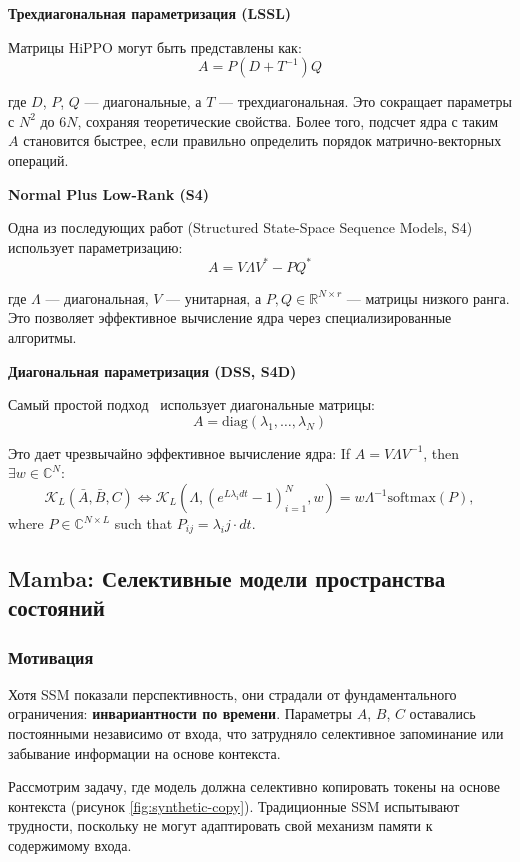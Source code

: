 \documentclass[11pt]{extarticle}
\begin{document}
\textbf{Трехдиагональная параметризация (LSSL)}

Матрицы HiPPO могут быть представлены как:
$$A = P(D + T^{-1})Q$$

где $D$, $P$, $Q$ — диагональные, а $T$ — трехдиагональная. Это сокращает параметры с $N^2$ до $6N$, сохраняя теоретические свойства. Более того, подсчет ядра с таким $A$ становится быстрее, если правильно определить порядок матрично-векторных операций.

\textbf{Normal Plus Low-Rank (S4)}

Одна из последующих работ (Structured State-Space Sequence Models, S4)~\cite{gu2022efficientlymodelinglongsequences} использует параметризацию:
$$A = V\Lambda V^* - PQ^*$$

где $\Lambda$ — диагональная, $V$ — унитарная, а $P, Q \in \mathbb{R}^{N \times r}$ — матрицы низкого ранга. Это позволяет эффективное вычисление ядра через специализированные алгоритмы.

\textbf{Диагональная параметризация (DSS, S4D)}

Самый простой подход~\cite{gupta2022diagonalstatespaceseffective,gu2022parameterizationinitializationdiagonalstate} использует диагональные матрицы:
$$A = \text{diag}(\lambda_1, \ldots, \lambda_N)$$

Это дает чрезвычайно эффективное вычисление ядра:
If $A=V\Lambda V^{-1}$, then $\exists w\in\mathbb{C}^N$:
$$
\mathcal{K}_L(\bar A, \bar B, C)\Leftrightarrow \mathcal{K}_L(\Lambda, (e^{L\lambda_i dt}-1)_{i=1}^N, w)=w\Lambda^{-1}\text{softmax}(P),
$$
where $P\in\mathbb{C}^{N\times L}$ such that $P_{ij}=\lambda_ij\cdot dt$.

\subsection{Mamba: Селективные модели пространства состояний}

\subsubsection{Мотивация}

Хотя SSM показали перспективность, они страдали от фундаментального ограничения: \textbf{инвариантности по времени}. Параметры $A$, $B$, $C$ оставались постоянными независимо от входа, что затрудняло селективное запоминание или забывание информации на основе контекста.

Рассмотрим задачу, где модель должна селективно копировать токены на основе контекста (рисунок \ref{fig:synthetic-copy}). Традиционные SSM испытывают трудности, поскольку не могут адаптировать свой механизм памяти к содержимому входа. 
\end{document}
